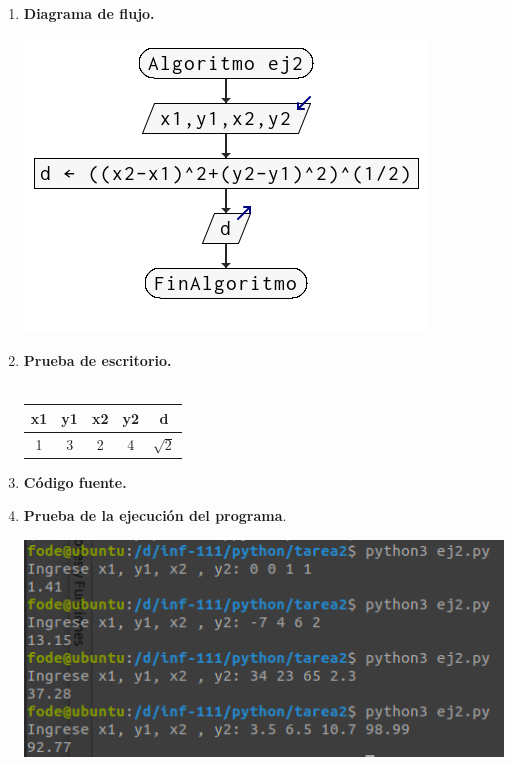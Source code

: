 \begin{enumerate}
\begin{enumerate}[\bfseries a)]
    \item \textbf{Diagrama de flujo.}\\
	\begin{center}
	    \includegraphics[scale=.9]{imagenes/tarea2/ej2df.png}
	\end{center}

    \item \textbf{Prueba de escritorio.}\\\\
	\begin{center}
	    \begin{tabular}{c|c|c|c|c}
		x1&y1&x2&y2&d\\	
		\hline
		1&3&2&4&$\sqrt{2}$\\
	    \end{tabular}
	\end{center}
	\vspace{2cm}
    
    \item \textbf{Código fuente.}\\ 
	
	
	\vspace{1cm}
    
    \item \textbf{Prueba de la ejecución del programa}.\\
	\begin{center}
	    \includegraphics[scale=.7]{imagenes/tarea2/ej2.png}
	\end{center}


\end{enumerate}
\end{enumerate}
